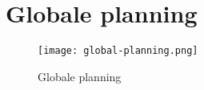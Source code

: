 \section{Globale planning}\label{appendix:global-planning}

\begin{figure}[hbt!]
  \begin{sideways}
   \begin{minipage}{1.25\textwidth}
    \texttt{[image: global-planning.png]}
   \end{minipage}
  \end{sideways}
  \centering
  \caption{Globale planning}
  \label{fig:global-planning}
 \end{figure}

\newpage